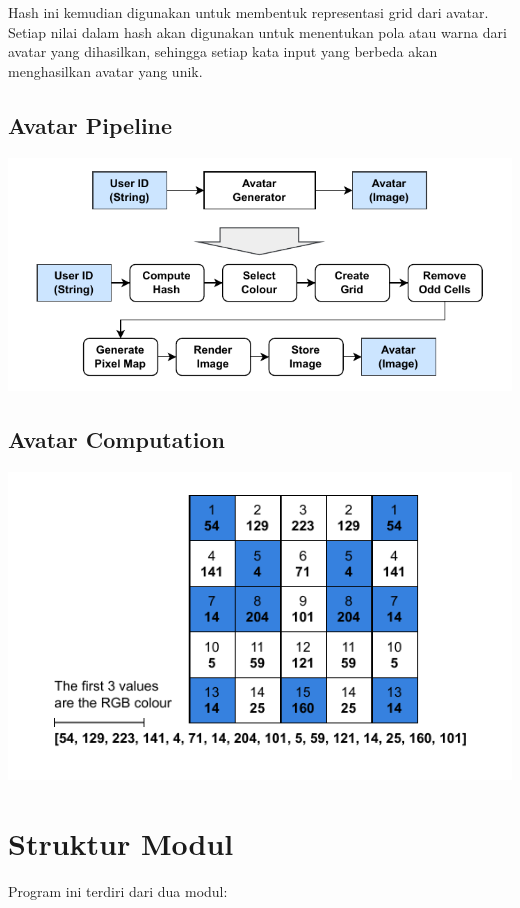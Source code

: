 Hash ini kemudian digunakan untuk membentuk representasi grid dari avatar. Setiap nilai dalam hash akan digunakan untuk menentukan pola atau warna dari avatar yang dihasilkan, sehingga setiap kata input yang berbeda akan menghasilkan avatar yang unik.


\subsection{Avatar Pipeline}
	\begin{center}
		\includegraphics[width=1\textwidth]{../assets/avatar-pipeline.pdf}
	\end{center}

\subsection{Avatar Computation}
	\begin{center}		\includegraphics[width=1\textwidth]{../assets/avatar-computation.pdf}
	\end{center}


\section{Struktur Modul}
Program ini terdiri dari dua modul:

